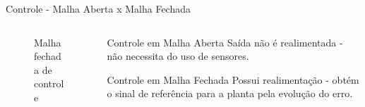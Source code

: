 \documentclass[10pt]{beamer}
\begin{document}
\begin{frame}[fragile]{Controle - Malha Aberta x Malha Fechada}
\begin{columns}[T,onlytextwidth]
\begin{column}{.5\textwidth}
\begin{figure}[!ht]
\caption{Malha fechada de controle\label{mfechadatikz}}
\end{figure}
\end{column}

\begin{column}{.5\textwidth}

\begin{block}{Controle em Malha Aberta}
Saída não é realimentada - não necessita do uso de sensores.
\newline
\newline
\newline
\end{block}

\begin{block}{Controle em Malha Fechada}
Possui realimentação - obtém o sinal de referência para a planta pela evolução do erro.\end{block}

\end{column}

\end{columns}
\end{frame}
\end{document}
